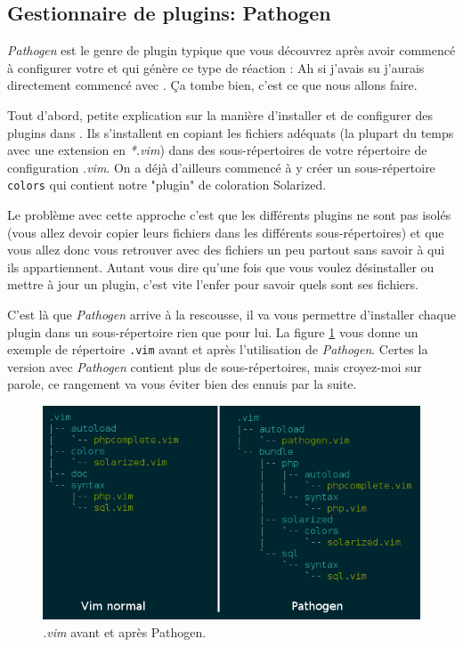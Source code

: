 \subsection{Gestionnaire de plugins: Pathogen}

\emph{Pathogen} est le genre de plugin typique que vous découvrez après avoir commencé à configurer votre \vim et qui génère ce type de réaction : \og Ah si j'avais su j'aurais directement commencé avec \fg. Ça tombe bien, c'est ce que nous allons faire.

Tout d'abord, petite explication sur la manière d'installer et de configurer des plugins dans \vim. Ils s'installent en copiant les fichiers adéquats (la plupart du temps avec une extension en \emph{*.vim}) dans des sous-répertoires de votre répertoire de configuration \emph{.vim}. On a déjà d'ailleurs commencé à y créer un sous-répertoire \Verb|colors| qui contient notre "plugin" de coloration Solarized.

Le problème avec cette approche c'est que les différents plugins ne sont pas isolés (vous allez devoir copier leurs fichiers dans les différents sous-répertoires) et que vous allez donc vous retrouver avec des fichiers un peu partout sans savoir à qui ils appartiennent. Autant vous dire qu'une fois que vous voulez désinstaller ou mettre à jour un plugin, c'est vite l'enfer pour savoir quels sont ses fichiers.

C'est là que \emph{Pathogen} arrive à la rescousse, il va vous permettre d'installer chaque plugin dans un sous-répertoire rien que pour lui. La figure \ref{fig:pathogen-tree} vous donne un exemple de répertoire \Verb|.vim| avant et après l'utilisation de \emph{Pathogen}. Certes la version avec \emph{Pathogen} contient plus de sous-répertoires, mais croyez-moi sur parole, ce rangement va vous éviter bien des ennuis par la suite.

\begin{figure}%
  \includegraphics[width=\linewidth]{graphics/pathogen-tree.png}
  \caption{\emph{.vim} avant et après Pathogen.}
  \label{fig:pathogen-tree}
\end{figure}

